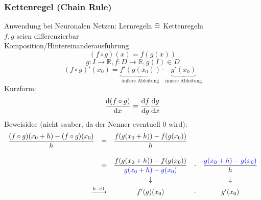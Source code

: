 \subsubsection*{Kettenregel (Chain Rule)}
Anwendung bei Neuronalen Netzen: Lernregeln $\mathrel{\widehat{=}}$ Kettenregeln \\
$f, g$ seien differenzierbar \\
Komposition/Hintereinanderausführung
\begin{equation*}
	(f \circ g)(x) = f(g(x))
\end{equation*}
\begin{equation*}
	g: I \rightarrow \mathbb{R}, f: D \rightarrow \mathbb{R}, g(I) \in D
\end{equation*}
\begin{equation*}
	(f \circ g)' (x_0) = \underbrace{f'(g(x_0))}_{\text{äußere Ableitung}} \cdot \underbrace{g'(x_0)}_{\text{innere Ableitung}}
\end{equation*}
Kurzform:
\begin{equation*}
	\frac{\mathrm d (f \circ g)}{\mathrm d x} = \frac{\mathrm d f}{\mathrm d g} \frac{\mathrm d g}{\mathrm d x}
\end{equation*}
Beweisidee (nicht sauber, da der Nenner eventuell $0$ wird):
\begin{equation*}
  \begin{array}{rcccc}\displaystyle
    \frac{(f \circ g)(x_0 + h) - (f \circ g)(x_0)}{h} &=& \multicolumn{3}{l}{\displaystyle\frac{f(g(x_0 + h)) - f(g(x_0))}{h}} \vspace{.5cm}\\
    &=& \displaystyle\frac{f(g(x_0 + h)) - f(g(x_0))}{\textcolor{blue}{g(x_0 + h) - g(x_0)}} & \cdot & \displaystyle\frac{\textcolor{blue}{g(x_0 + h) - g(x_0)}}{h} \vspace{.1cm}\\
    & & \downarrow & & \downarrow\vspace{.1cm} \\
    \multicolumn{2}{r}{\xrightarrow{h \rightarrow 0}} & f'(g)(x_0) & \cdot & g'(x_0)
  \end{array}
\end{equation*}

